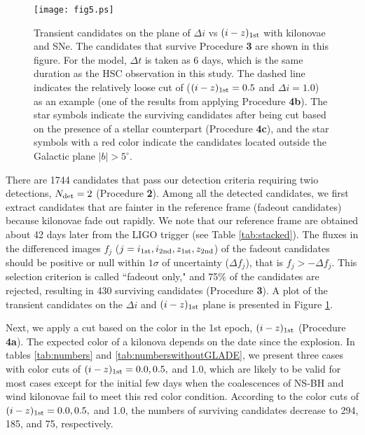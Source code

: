 \documentclass[]{pasj01}
\begin{document}
\begin{figure}
 \begin{center}
  \texttt{[image: fig5.ps]} 
 \end{center}
\caption{Transient candidates on the plane of $\Delta i$ vs $(i-z)_{\rm 1st}$ with kilonovae and SNe.
The candidates that survive  Procedure {\bf 3} are shown in this figure.
For the model, 
$\Delta t$ is taken as 6 days, which is the same duration as the HSC observation in this study.
The dashed line indicates the relatively loose cut of ($(i-z)_{\rm 1st}=0.5$ and $\Delta i=1.0$)  as an example (one of the results from applying Procedure {\bf 4b}).
The star symbols indicate the surviving candidates after being cut based on the presence of a stellar counterpart (Procedure {\bf 4c}),
and the star symbols with a red color indicate the candidates located outside the Galactic plane $|b|> 5^{\circ}$.
}\label{fig:dmdcolor}
\end{figure}
There are 1744 candidates that pass our detection criteria requiring twio detections, $N_{\rm det}=2$ (Procedure {\bf 2}).
Among all the detected candidates, we first extract candidates that are fainter in the reference frame (fadeout candidates)
because kilonovae fade out rapidly.  We note that our reference frame are obtained about 42 days later from the LIGO trigger (see Table \ref{tab:stacked}).
The fluxes in the differenced images $f_{j}$  ($j=i_{\rm 1st}, i_{\rm 2nd}, z_{\rm 1st}, z_{\rm 2nd}$)
of the fadeout candidates should be positive or null within $1\sigma$ of uncertainty ($\Delta f_{j}$), that is $f_{j}>-\Delta f_{j}$.
This selection criterion is called ``fadeout only," and 75\% of the candidates are rejected,
resulting in 430 surviving candidates (Procedure {\bf 3}).
A  plot of the transient candidates on the $\Delta i$ and $(i-z)_{\rm 1st}$ plane is presented in Figure \ref{fig:dmdcolor}.

Next, we apply a cut based on the color in the 1st epoch, $(i-z)_{\rm 1st}$  (Procedure {\bf 4a}).
The expected color of a kilonova depends on the date since the explosion.
In tables \ref{tab:numbers} and \ref{tab:numberswithoutGLADE}, we present  three cases with color cuts of $(i-z)_{\rm 1st}=0.0, 0.5,$ and 1.0,
which are likely to be valid for most cases except for the initial few days 
when the coalescences of NS-BH and wind kilonovae fail to meet this red color condition.
According to the color cuts of $(i-z)_{\rm 1st}=0.0, 0.5,$ and 1.0,
the numbers of surviving candidates decrease to 294, 185, and 75, respectively.
\end{document}
